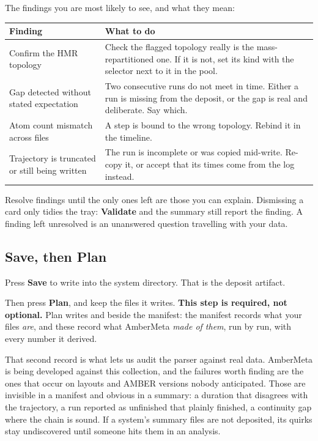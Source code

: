 \documentclass[11pt]{article}
\begin{document}
\noindent The findings you are most likely to see, and what they mean:

\begin{center}\small
\begin{tabularx}{\textwidth}{@{}l>{\raggedright\arraybackslash}X@{}}
\toprule
\textbf{Finding} & \textbf{What to do}\\
\midrule
Confirm the HMR topology & Check the flagged topology really is the mass-repartitioned one. If it is not, set its kind with the selector next to it in the pool.\\
Gap detected without stated expectation & Two consecutive runs do not meet in time. Either a run is missing from the deposit, or the gap is real and deliberate. Say which.\\
Atom count mismatch across files & A step is bound to the wrong topology. Rebind it in the timeline.\\
Trajectory is truncated or still being written & The run is incomplete or was copied mid-write. Re-copy it, or accept that its times come from the log instead.\\
\bottomrule
\end{tabularx}
\end{center}

Resolve findings until the only ones left are those you can explain. Dismissing a card
only tidies the tray: \textbf{Validate} and the summary still report the finding. A
finding left unresolved is an unanswered question travelling with your data.

\subsection{Save, then Plan}

Press \textbf{Save} to write  into the system directory. That is the
deposit artifact.

Then press \textbf{Plan}, and keep the files it writes. \textbf{This step is required,
not optional.} Plan writes  and  beside
the manifest: the manifest records what your files \emph{are}, and these record what
AmberMeta \emph{made of them}, run by run, with every number it derived.

That second record is what lets us audit the parser against real data. AmberMeta is being
developed against this collection, and the failures worth finding are the ones that occur
on layouts and AMBER versions nobody anticipated. Those are invisible in a manifest and
obvious in a summary: a duration that disagrees with the trajectory, a run reported as
unfinished that plainly finished, a continuity gap where the chain is sound. If a system's
summary files are not deposited, its quirks stay undiscovered until someone hits them in
an analysis.
\end{document}
